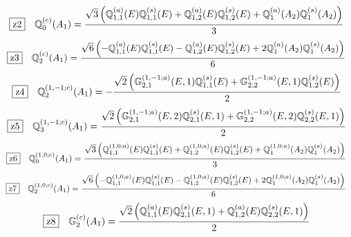 \documentclass[fleqn,10pt,landscape]{jsarticle}
\begin{document}
\begin{dmath*}
\hspace*{3mm}\fbox{z2}\quad \mathbb{Q}_{0}^{(c)}(A_{1})=\frac{\sqrt{3} \left(\mathbb{Q}_{1,1}^{(a)}(E) \mathbb{Q}_{1,1}^{(s)}(E) + \mathbb{Q}_{1,2}^{(a)}(E) \mathbb{Q}_{1,2}^{(s)}(E) + \mathbb{Q}_{1}^{(a)}(A_{2}) \mathbb{Q}_{1}^{(s)}(A_{2})\right)}{3}
\end{dmath*}
\begin{dmath*}
\hspace*{3mm}\fbox{z3}\quad \mathbb{Q}_{2}^{(c)}(A_{1})=\frac{\sqrt{6} \left(- \mathbb{Q}_{1,1}^{(a)}(E) \mathbb{Q}_{1,1}^{(s)}(E) - \mathbb{Q}_{1,2}^{(a)}(E) \mathbb{Q}_{1,2}^{(s)}(E) + 2 \mathbb{Q}_{1}^{(a)}(A_{2}) \mathbb{Q}_{1}^{(s)}(A_{2})\right)}{6}
\end{dmath*}
\begin{dmath*}
\hspace*{3mm}\fbox{z4}\quad \mathbb{Q}_{2}^{(1,-1;c)}(A_{1})=- \frac{\sqrt{2} \left(\mathbb{G}_{2,1}^{(1,-1;a)}(E,1) \mathbb{Q}_{1,1}^{(s)}(E) + \mathbb{G}_{2,2}^{(1,-1;a)}(E,1) \mathbb{Q}_{1,2}^{(s)}(E)\right)}{2}
\end{dmath*}
\begin{dmath*}
\hspace*{3mm}\fbox{z5}\quad \mathbb{Q}_{3}^{(1,-1;c)}(A_{1})=\frac{\sqrt{2} \left(\mathbb{G}_{2,1}^{(1,-1;a)}(E,2) \mathbb{Q}_{2,1}^{(s)}(E,1) + \mathbb{G}_{2,2}^{(1,-1;a)}(E,2) \mathbb{Q}_{2,2}^{(s)}(E,1)\right)}{2}
\end{dmath*}
\begin{dmath*}
\hspace*{3mm}\fbox{z6}\quad \mathbb{Q}_{0}^{(1,0;c)}(A_{1})=\frac{\sqrt{3} \left(\mathbb{Q}_{1,1}^{(1,0;a)}(E) \mathbb{Q}_{1,1}^{(s)}(E) + \mathbb{Q}_{1,2}^{(1,0;a)}(E) \mathbb{Q}_{1,2}^{(s)}(E) + \mathbb{Q}_{1}^{(1,0;a)}(A_{2}) \mathbb{Q}_{1}^{(s)}(A_{2})\right)}{3}
\end{dmath*}
\begin{dmath*}
\hspace*{3mm}\fbox{z7}\quad \mathbb{Q}_{2}^{(1,0;c)}(A_{1})=\frac{\sqrt{6} \left(- \mathbb{Q}_{1,1}^{(1,0;a)}(E) \mathbb{Q}_{1,1}^{(s)}(E) - \mathbb{Q}_{1,2}^{(1,0;a)}(E) \mathbb{Q}_{1,2}^{(s)}(E) + 2 \mathbb{Q}_{1}^{(1,0;a)}(A_{2}) \mathbb{Q}_{1}^{(s)}(A_{2})\right)}{6}
\end{dmath*}
\begin{dmath*}
\hspace*{3mm}\fbox{z8}\quad \mathbb{G}_{2}^{(c)}(A_{1})=\frac{\sqrt{2} \left(\mathbb{Q}_{1,1}^{(a)}(E) \mathbb{Q}_{2,1}^{(s)}(E,1) + \mathbb{Q}_{1,2}^{(a)}(E) \mathbb{Q}_{2,2}^{(s)}(E,1)\right)}{2}
\end{dmath*}
\end{document}
